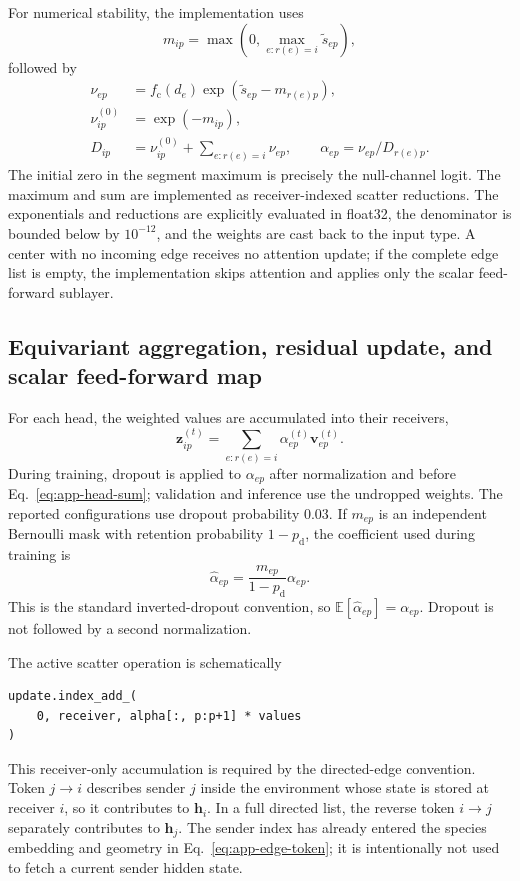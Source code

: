 \documentclass[aps,prx,preprint,notitlepage,superscriptaddress,nofootinbib,floatfix]{revtex4-2}
\newcommand{\vect}[1]{\bm{#1}}
\newif\ifshowrevisions
\newenvironment{draftthirtyoneblock}
  {\ifshowrevisions\color{draftthirtyonecolor}\fi}
  {}
\begin{document}
\begin{draftthirtyoneblock}
For numerical stability, the implementation uses
\begin{equation}
 m_{ip}=\max\!\left(0,\max_{e:r(e)=i}\widetilde s_{ep}\right),
 \label{eq:app-segment-max}
\end{equation}
followed by
\begin{align}
 \nu_{ep}&=f_{\mathrm c}(d_e)
 \exp(\widetilde s_{ep}-m_{r(e)p}),\\
 \nu_{ip}^{(0)}&=\exp(-m_{ip}),\\
 D_{ip}&=\nu_{ip}^{(0)}+\sum_{e:r(e)=i}\nu_{ep},\qquad
 \alpha_{ep}=\nu_{ep}/D_{r(e)p}.
 \label{eq:app-stable-softmax}
\end{align}
The initial zero in the segment maximum is precisely the null-channel logit.
The maximum and sum are implemented as receiver-indexed scatter reductions.
The exponentials and reductions are explicitly evaluated in float32, the
denominator is bounded below by \(10^{-12}\), and the weights are cast back to
the input type. A center with no incoming edge receives no attention update;
if the complete edge list is empty, the implementation skips attention and
applies only the scalar feed-forward sublayer.

\subsection{Equivariant aggregation, residual update, and scalar feed-forward
map}

For each head, the weighted values are accumulated into their receivers,
\begin{equation}
 \vect z_{ip}^{(t)}
 =\sum_{e:r(e)=i}\alpha_{ep}^{(t)}\vect v_{ep}^{(t)}.
 \label{eq:app-head-sum}
\end{equation}
During training, dropout is applied to \(\alpha_{ep}\) after normalization and
before Eq.~\eqref{eq:app-head-sum}; validation and inference use the
undropped weights. The reported configurations use dropout probability
0.03. If \(m_{ep}\) is an independent Bernoulli mask with retention
probability \(1-p_{\mathrm d}\), the coefficient used during training is
\begin{equation}
 \widehat\alpha_{ep}
 =\frac{m_{ep}}{1-p_{\mathrm d}}\alpha_{ep}.
 \label{eq:app-attention-dropout}
\end{equation}
This is the standard inverted-dropout convention, so
\(\mathbb E[\widehat\alpha_{ep}]=\alpha_{ep}\). Dropout is not followed by a
second normalization.

The active scatter operation is schematically
\begin{verbatim}
update.index_add_(
    0, receiver, alpha[:, p:p+1] * values
)
\end{verbatim}
This receiver-only accumulation is required by the directed-edge convention.
Token \(j\rightarrow i\) describes sender \(j\) inside the environment whose
state is stored at receiver \(i\), so it contributes to \(\vect h_i\). In a
full directed list, the reverse token \(i\rightarrow j\) separately
contributes to \(\vect h_j\). The sender index has already entered the species
embedding and geometry in Eq.~\eqref{eq:app-edge-token}; it is intentionally
not used to fetch a current sender hidden state.


\end{draftthirtyoneblock}
\end{document}
